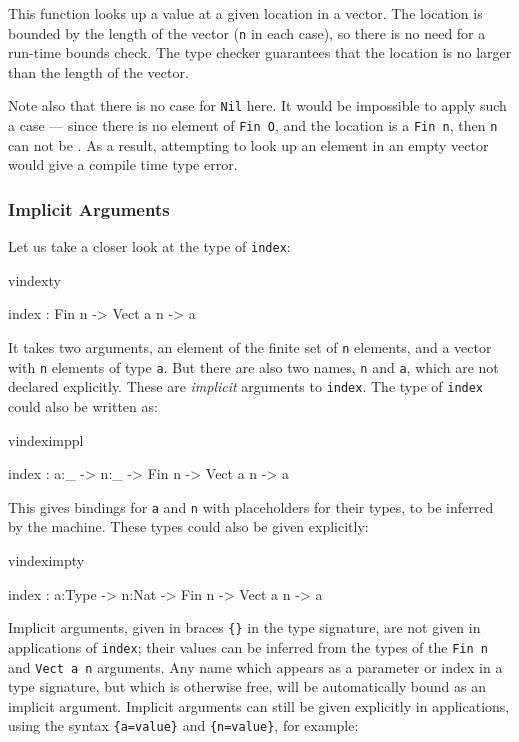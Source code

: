 \noindent
This function looks up a value at a given location in a vector. The location is
bounded by the length of the vector (\texttt{n} in each case), so there is no
need for a run-time bounds check. The type checker guarantees that the location
is no larger than the length of the vector.

Note also that there is no case for \texttt{Nil} here. It would be impossible
to apply such a case --- since there is no element of \texttt{Fin O}, and the
location is a \texttt{Fin n}, then \texttt{n} can not be .  As a result,
attempting to look up an element in an empty vector would give a compile time
type error.

\subsubsection{Implicit Arguments}

Let us take a closer look at the type of \texttt{index}:

\begin{SaveVerbatim}{vindexty}

index : Fin n -> Vect a n -> a

\end{SaveVerbatim}

\noindent
It takes two arguments, an element of the finite set of \texttt{n} elements, and a vector
with \texttt{n} elements of type \texttt{a}. But there are also two names, 
\texttt{n} and \texttt{a}, which are not declared explicitly. These are \emph{implicit}
arguments to \texttt{index}. The type of \texttt{index} could also be written as:

\begin{SaveVerbatim}{vindeximppl}

index : {a:_} -> {n:_} -> Fin n -> Vect a n -> a

\end{SaveVerbatim}

\noindent
This gives bindings for \texttt{a} and \texttt{n} with placeholders for
their types, to be inferred by the machine. These types could also be given explicitly:

\begin{SaveVerbatim}{vindeximpty}

index : {a:Type} -> {n:Nat} -> Fin n -> Vect a n -> a

\end{SaveVerbatim}

\noindent
Implicit arguments, given in braces \texttt{\{\}} in the type signature, are
not given in applications of \texttt{index}; their values can be inferred from
the types of the \texttt{Fin n} and \texttt{Vect a n} arguments. Any name which
appears as a parameter or index in a type signature, but which is otherwise
free, will be automatically bound as an implicit argument.  Implicit arguments
can still be given explicitly in applications, using the syntax
\texttt{\{a=value\}} and \texttt{\{n=value\}}, for example:

